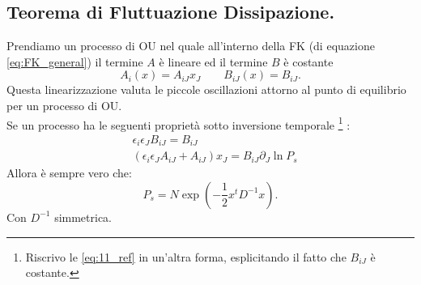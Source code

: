\subsection{Teorema di Fluttuazione Dissipazione.}%
\label{sub:Relazione di Onsager e Teorema di Fluttuazione Dissipazione.}
Prendiamo un processo di OU nel quale all'interno della FK (di equazione \ref{eq:FK_general}) il termine $A$ è lineare ed il termine $B$ è costante
\[
    A_i(x) = A_{iJ}x_J \qquad
    B_{iJ}(x) = B_{iJ}
.\] 
Questa linearizzazione valuta le piccole oscillazioni attorno al punto di equilibrio per un processo di OU.\\
Se un processo ha le seguenti proprietà sotto inversione temporale
\footnote{Riscrivo le \ref{eq:11_ref} in un'altra forma, esplicitando il fatto che $B_{iJ}$ è costante.}
:
\begin{equation}
\begin{aligned}
    &\epsilon_i\epsilon_J B_{iJ}=B_{iJ}\\
    &\left(\epsilon_i\epsilon_JA_{iJ} + A_{iJ}\right)x_J = B_{iJ}\partial_{J}\ln P_s \label{eq:11_B}
\end{aligned}
\end{equation}
Allora è sempre vero che:
\[
    P_s = N \exp\left(-\frac{1}{2}x^tD^{-1}x\right)
.\] 
Con $D^{-1}$ simmetrica.
